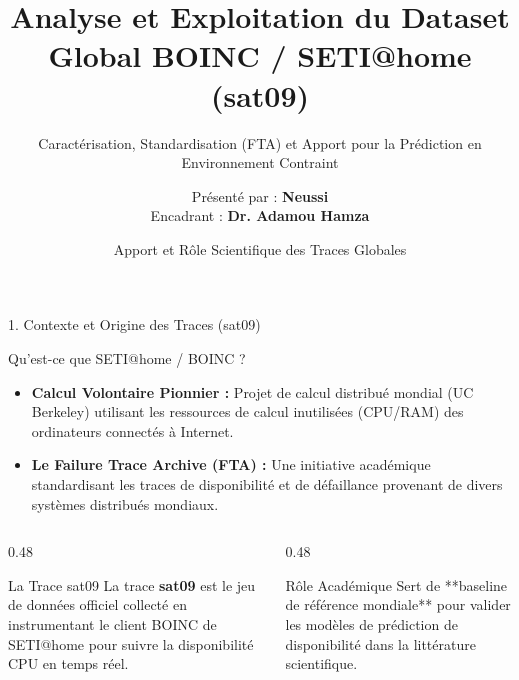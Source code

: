 \documentclass[10pt,aspectratio=169]{beamer}
\title[Présentation du Dataset SETI@home]{Analyse et Exploitation du Dataset Global BOINC / SETI@home (sat09)}
\subtitle{Caractérisation, Standardisation (FTA) et Apport pour la Prédiction en Environnement Contraint}
\author[Mémoire de Master 2]{Présenté par : \textbf{Neussi} \\[0.5em] \small Encadrant : \textbf{Dr. Adamou Hamza}}
\institute[UY1]{Université de Yaoundé I \\ Département d'Informatique \\ Spécialité : Systèmes et Réseaux}
\date[Juin 2026]{Apport et Rôle Scientifique des Traces Globales}
\begin{document}
\begin{frame}
  \titlepage
\end{frame}

\begin{frame}{1. Contexte et Origine des Traces (sat09)}
  \begin{block}{Qu'est-ce que SETI@home / BOINC ?}
    \begin{itemize}
      \item \textbf{Calcul Volontaire Pionnier :} Projet de calcul distribué mondial (UC Berkeley) utilisant les ressources de calcul inutilisées (CPU/RAM) des ordinateurs connectés à Internet.
      \item \textbf{Le Failure Trace Archive (FTA) :} Une initiative académique standardisant les traces de disponibilité et de défaillance provenant de divers systèmes distribués mondiaux.
    \end{itemize}
  \end{block}
  
  \begin{columns}[T]
    \begin{column}{0.48\textwidth}
      \begin{alertblock}{La Trace sat09}
        La trace \textbf{sat09} est le jeu de données officiel collecté en instrumentant le client BOINC de SETI@home pour suivre la disponibilité CPU en temps réel.
      \end{alertblock}
    \end{column}
    
    \begin{column}{0.48\textwidth}
      \begin{exampleblock}{Rôle Académique}
        Sert de **baseline de référence mondiale** pour valider les modèles de prédiction de disponibilité dans la littérature scientifique.
      \end{exampleblock}
    \end{column}
  \end{columns}
\end{frame}
\end{document}
